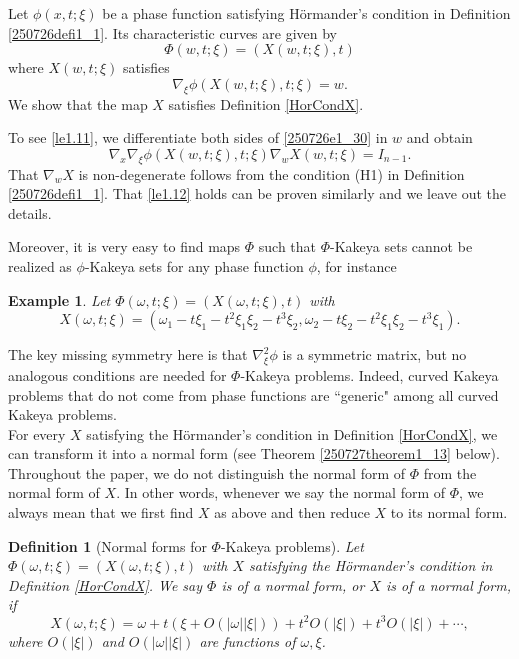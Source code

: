 \documentclass{article}
\numberwithin{equation}{section}
\theoremstyle{plain}
\newtheorem{definition}[theorem]{Definition}
\newtheorem{example}[theorem]{Example}
\begin{document}
	 Let $\phi(x, t; \xi)$ be a phase function satisfying H\"ormander's condition in Definition \ref{250726defi1_1}. Its characteristic curves are given by 
	 \begin{equation}
	\Phi(w, t; \xi)= (X(w, t; \xi), t)
	 \end{equation}
where $X(w, t; \xi)$ satisfies 
\begin{equation}\label{250726e1_30}
\nabla_{\xi} \phi(X(w, t; \xi), t; \xi)=w.
\end{equation}
We show that the map $X$ satisfies Definition \ref{HorCondX}.

To see \eqref{le1.11}, we differentiate both sides of \eqref{250726e1_30} in $w$ and obtain 
\begin{equation}
\nabla_{x} \nabla_{\xi} \phi(X(w, t; \xi), t; \xi) \nabla_{w} X(w, t; \xi)=I_{n-1}.
\end{equation}
That $\nabla_{w} X$ is non-degenerate follows from the condition (H1) in Definition \ref{250726defi1_1}. That \eqref{le1.12} holds can be proven similarly and we leave out the details.

 Moreover, it is very easy to find 
	 maps $\Phi$ such that $\Phi$-Kakeya sets cannot be realized as $\phi$-Kakeya sets for any phase function $\phi$, for instance
\begin{example}
	Let $\Phi(\omega, t; \xi)= (X(\omega, t; \xi), t)$ with 
	\begin{equation}
	X(\omega, t; \xi)=(\omega_1-t\xi_1-t^2\xi_1\xi_2-t^3\xi_2,\omega_2-t\xi_2-t^2\xi_1\xi_2-t^3\xi_1).
	\end{equation}
	\end{example}
The key missing symmetry here is that $\nabla^2_{\xi}\phi$ is a symmetric matrix, but no analogous conditions are needed for $\Phi$-Kakeya problems. Indeed, curved Kakeya problems that do not come from phase functions are ``generic" among all curved Kakeya problems. \\
	
	For every $X$ satisfying the H\"ormander's condition in Definition \ref{HorCondX}, we can transform it into a normal form (see Theorem \ref{250727theorem1_13} below).  Throughout the paper, we do not distinguish the normal form of $\Phi$ from the normal form of $X$. In other words, whenever we say the normal form of $\Phi$, we always mean that we first find  $X$ as above and then reduce $X$ to its normal form. 
	
	\begin{definition}[Normal forms for $\Phi$-Kakeya problems]\label{NormalForm}
		Let $\Phi(\omega, t; \xi)=\left(X(\omega, t; \xi),t\right)$ with $X$ satisfying the H\"ormander's condition in Definition \ref{HorCondX}. We say $\Phi$ is of a normal form, or $X$ is of a normal form, if
		\begin{equation}
			X(\omega, t; \xi)= \omega+ t(\xi+O(|\omega||\xi|))+ t^2 O(|\xi|)+t^3 O(|\xi|)+\cdots,
		\end{equation}
		where $O(|\xi|)$ and $O(|\omega||\xi|)$ are functions of $\omega,\xi$.
	\end{definition}
	
\end{document}
